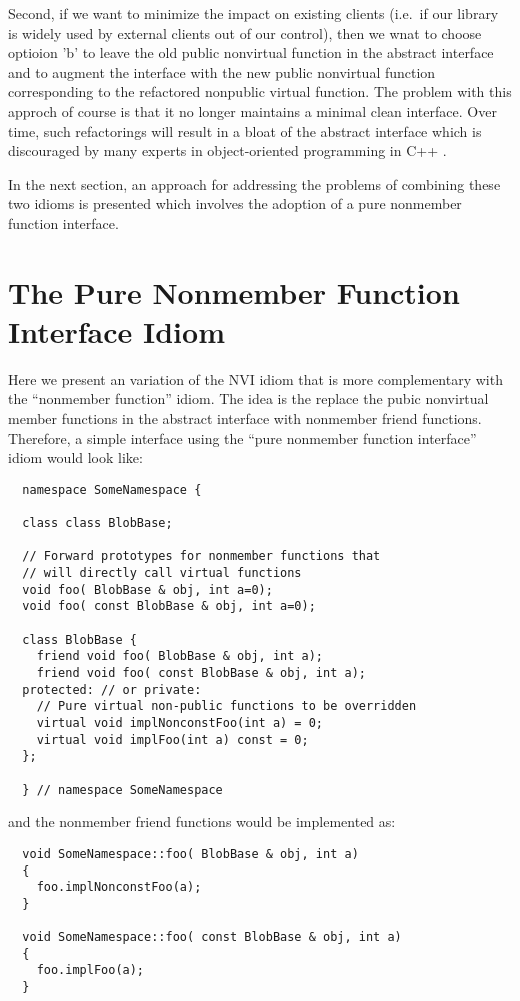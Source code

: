 \documentclass[pdf,ps2pdf,11pt]{SANDreport}
\begin{document}
Second, if we want to minimize the impact on existing clients (i.e.\ if our
library is widely used by external clients out of our control), then we wnat
to choose optioion 'b' to leave the old public nonvirtual function in the
abstract interface and to augment the interface with the new public nonvirtual
function corresponding to the refactored nonpublic virtual function.  The
problem with this approch of course is that it no longer maintains a minimal
clean interface.  Over time, such refactorings will result in a bloat of the
abstract interface which is discouraged by many experts in object-oriented
programming in C++ {}\cite[Item 33]{C++CodingStandards05}.

In the next section, an approach for addressing the problems of combining
these two idioms is presented which involves the adoption of a pure nonmember
function interface.

%
\section{The Pure Nonmember Function Interface Idiom}
%

Here we present an variation of the NVI idiom that is more complementary with
the ``nonmember function'' idiom.  The idea is the replace the pubic
nonvirtual member functions in the abstract interface with nonmember friend
functions.  Therefore, a simple interface using the ``pure nonmember function
interface'' idiom would look like:

{\small\begin{verbatim}
  namespace SomeNamespace {

  class class BlobBase;

  // Forward prototypes for nonmember functions that
  // will directly call virtual functions
  void foo( BlobBase & obj, int a=0);
  void foo( const BlobBase & obj, int a=0);

  class BlobBase {
    friend void foo( BlobBase & obj, int a);
    friend void foo( const BlobBase & obj, int a);
  protected: // or private:
    // Pure virtual non-public functions to be overridden
    virtual void implNonconstFoo(int a) = 0;
    virtual void implFoo(int a) const = 0;
  };

  } // namespace SomeNamespace
\end{verbatim}}

{}\noindent{}and the nonmember friend functions would be implemented as:

{\small\begin{verbatim}
  void SomeNamespace::foo( BlobBase & obj, int a)
  {
    foo.implNonconstFoo(a);
  }

  void SomeNamespace::foo( const BlobBase & obj, int a)
  {
    foo.implFoo(a);
  }
\end{verbatim}}
\end{document}
